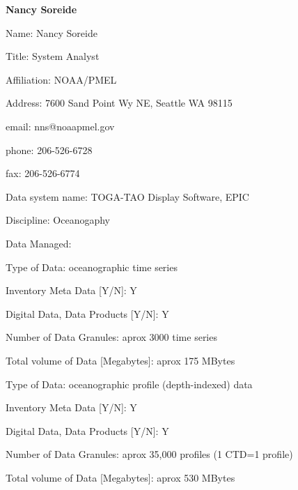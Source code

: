 \begin{center}
\LARGE
{\bf Nancy Soreide}
\end{center}
\large
{}
\normalsize
\smallskip
\begin{description}
\item{Name:}  Nancy Soreide
\item{Title:}  System Analyst
\item{Affiliation:}  NOAA/PMEL
\item{Address:}  7600 Sand Point Wy NE, Seattle WA 98115
\item{email:}  nns@noaapmel.gov
\item{phone:}  206-526-6728
\item{fax:}  206-526-6774
\end{description}
\medskip
\large
{}
\normalsize
\medskip
\begin{description}

\item{Data system name:}  TOGA-TAO Display Software, EPIC
\item{Discipline:}  Oceanogaphy
\item{Data Managed:}
	\begin{description}
	\item{Type of Data:}  oceanographic time series
	\item{Inventory Meta Data [Y/N]:}  Y
	\item{Digital Data, Data Products [Y/N]:}  Y
	\item{Number of Data Granules:}  aprox 3000 time series
	\item{Total volume of Data [Megabytes]:}  aprox 175 MBytes
\medskip
	\item{Type of Data:}  oceanographic profile (depth-indexed) data
	\item{Inventory Meta Data [Y/N]:}  Y
	\item{Digital Data, Data Products [Y/N]:}  Y
	\item{Number of Data Granules:}  aprox 35,000 profiles (1 CTD=1
			profile) 
	\item{Total volume of Data [Megabytes]:}  aprox 530 MBytes
	\end{description}
\end{description}

\medskip
\large
{}
\normalsize
\medskip


\bigskip
{}
\bigskip

